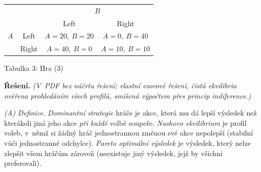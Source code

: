 \begin{center}
\begin{tabular}{cc|c|c}
  & & \multicolumn{2}{c}{$B$} \\
  & & Left & Right \\
\hline
$A$ & Left  & $A = 20,\ B = 20$ & $A = 0,\ B = 40$ \\
    & Right & $A = 40,\ B = 0$  & $A = 10,\ B = 10$ \\
\end{tabular}

\smallskip
Tabulka 3: Hra (3)
\end{center}

\medskip
\noindent\textbf{Řešení.} \textit{(V~PDF bez náčrtu řešení; vlastní vzorové řešení, čistá ekvilibria ověřena prohledáním všech profilů, smíšená výpočtem přes princip indiference.)}\par

\noindent\emph{(A) Definice.} \textit{Dominantní strategie} hráče je akce, která mu dá lepší výsledek než kterákoli jiná jeho akce \emph{při každé} volbě soupeře. \textit{Nashovo ekvilibrium} je profil voleb, v~němž si žádný hráč jednostrannou změnou své akce nepolepší (stabilní vůči jednostranné odchylce). \textit{Pareto optimální výsledek} je výsledek, který nelze zlepšit všem hráčům zároveň (neexistuje jiný výsledek, jejž by všichni preferovali).

